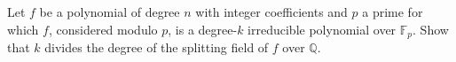 Let $f$ be a polynomial of degree $n$ with integer coefficients and $p$ a prime for which $f$, considered modulo $p$, is a degree-$k$ irreducible polynomial over $\mathbb{F}_p$. Show that $k$ divides the degree of the splitting field of $f$ over $\mathbb{Q}$.